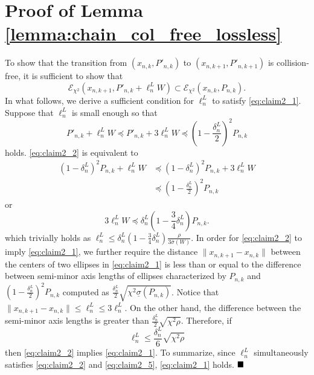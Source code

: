 \documentclass[Afour,sageh,times]{sagej}
\renewcommand{\qed}{\hfill\blacksquare}
\begin{document}
\section{Proof of Lemma \ref{lemma:chain_col_free_lossless}\label{appendix:chain_col_free_lossless}}
To show that the transition from $(x_{n,k}, P'_{n,k})$ to $(x_{n,k+1}, P'_{n,k+1})$ is collision-free, it is sufficient to show that
\begin{equation}
\label{eq:claim2_1}
    \mathcal{E}_{\chi^2}(x_{n,k+1}, P'_{n,k}+\ell^L_n W) \subset\mathcal{E}_{\chi^2}(x_{n,k}, P_{n,k}).
\end{equation}
In what follows, we derive a sufficient condition for $\ell^L_n$ to satisfy \eqref{eq:claim2_1}. Suppose that $\ell^L_n$ is small enough so that
\begin{equation}
\label{eq:claim2_2}
   P'_{n,k}+\ell^L_n W \preceq P'_{n,k}+3\ell^L_n W \preceq \left(1-\frac{\delta^L_n}{2}\right)^2 P_{n,k}
\end{equation}
holds. \eqref{eq:claim2_2} is equivalent to
\begin{align*}
    (1-\delta^L_n)^2 P_{n,k}+\ell^L_n W &\preceq(1-\delta^L_n)^2 P_{n,k}+3\ell^L_n W\\
    &\preceq \left(1-\frac{\delta^L_n}{2}\right)^2 P_{n,k}
\end{align*}
or
\begin{equation}
    \label{eq:claim2_3}
   3 \ell^L_n W \preceq \delta^L_n \left(1-\frac{3}{4}\delta^L_n\right) P_{n,k}.
\end{equation}
which trivially holds as $    \ell^L_n \leq  \delta^L_n \left(1-\frac{3}{4}\delta^L_n\right) \frac{\rho}{3 \bar{\sigma}(W)}$.
In order for \eqref{eq:claim2_2} to imply \eqref{eq:claim2_1}, we further require the distance $\|x_{n,k+1}-x_{n,k}\|$ between the centers of two ellipses in \eqref{eq:claim2_1} is less than or equal to the difference between semi-minor axis lengths of ellipses characterized by $P_{n,k}$ and $(1-\frac{\delta^L_n}{2})^2 P_{n,k}$ computed as $\frac{\delta^L_n}{2}\sqrt{\chi^2\underline{\sigma}(P_{n,k})}$.
Notice that $
\|x_{n,k+1}-x_{n,k}\|\leq \ell^L_n \leq 3\ell^L_n$.
On the other hand, the difference between the semi-minor axis lengths is greater than $\frac{\delta^L_n}{2}\sqrt{\chi^2\rho}$. Therefore, if
\begin{equation}
    \label{eq:claim2_5}
    \ell^L_n \leq  \frac{\delta^L_n}{6}\sqrt{\chi^2\rho}
\end{equation}
then \eqref{eq:claim2_2} implies \eqref{eq:claim2_1}. To summarize, since $\ell^L_n$ simultaneously satisfies \eqref{eq:claim2_2} and \eqref{eq:claim2_5}, \eqref{eq:claim2_1} holds. $\qed$
\end{document}
